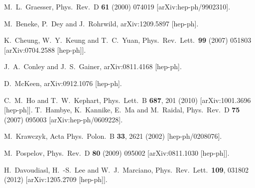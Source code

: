 \begin{thebibliography}{99}
  M.~L.~Graesser,
  Phys.\ Rev.\  D {\bf 61} (2000) 074019
  [arXiv:hep-ph/9902310].

  M.~Beneke, P.~Dey and J.~Rohrwild,
  arXiv:1209.5897 [hep-ph].

K.~Cheung, W.~Y.~Keung and T.~C.~Yuan,
Phys.\ Rev.\ Lett.\  {\bf 99} (2007) 051803 [arXiv:0704.2588
[hep-ph]].

  J.~A.~Conley and J.~S.~Gainer,
  arXiv:0811.4168 [hep-ph].

  D.~McKeen,
  arXiv:0912.1076 [hep-ph].

  C.~M.~Ho and T.~W.~Kephart,
  Phys.\ Lett.\ B {\bf 687}, 201 (2010)
  [arXiv:1001.3696 [hep-ph]].
  T.~Hambye, K.~Kannike, E.~Ma and M.~Raidal,
  Phys.\ Rev.\  D {\bf 75} (2007) 095003
  [arXiv:hep-ph/0609228].



  M.~Krawczyk,
  Acta Phys.\ Polon.\ B {\bf 33}, 2621 (2002)
  [hep-ph/0208076].

  M.~Pospelov,
  Phys.\ Rev.\  D {\bf 80} (2009) 095002
  [arXiv:0811.1030 [hep-ph]].


  H.~Davoudiasl, H.~-S.~Lee and W.~J.~Marciano,
  Phys.\ Rev.\ Lett.\  {\bf 109}, 031802 (2012)
  [arXiv:1205.2709 [hep-ph]].


\end{thebibliography}
